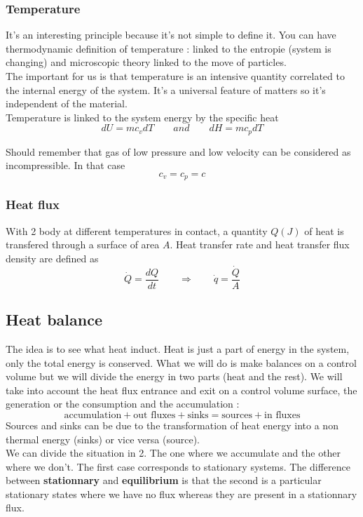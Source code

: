 	\subsubsection{Temperature}
		It's an interesting principle because it’s not simple to define it. You can have thermodynamic definition of temperature : linked to the entropie (system is changing) and microscopic theory linked to the move of particles. \\
		The important for us is that temperature is an intensive quantity correlated to the internal energy of the system. It’s a universal feature of matters so it’s independent of the material. \\
		Temperature is linked to the system energy by the specific heat 
		\begin{equation}
			dU = mc_v dT \qquad and \qquad dH = mc_p dT
		\end{equation}

		Should remember that gas of low pressure and low velocity can be considered as incompressible. In that case 
		\begin{equation}
			c_v = c_p = c
		\end{equation}		 
		
	\subsubsection{Heat flux}
		With 2 body at different temperatures in contact, a quantity $Q(J)$ of heat is transfered through a surface of area $A$. Heat transfer rate and heat transfer flux density are defined as 
		\begin{equation}
			\dot{Q} = \frac{dQ}{dt} \qquad \Rightarrow \qquad \dot{q} = \frac{\dot{Q}}{A}
		\end{equation}
		
\subsection{Heat balance}
		The idea is to see what heat induct. Heat is just a part of energy in the system, only the total energy is conserved. What we will do is make balances on a control volume but we will divide the energy in two parts (heat and the rest). We will take into account the heat flux entrance and exit on a control volume surface, the generation or the consumption and the accumulation :
		\begin{equation}
			\mbox{accumulation} + \mbox{out fluxes} + \mbox{sinks} = \mbox{sources} + \mbox{in fluxes}
		\end{equation}
		Sources and sinks can be due to the transformation of heat energy into a non thermal energy (sinks) or vice versa (source). \\
		We can divide the situation in 2. The one where we accumulate and the other where we don’t. The first case corresponds to stationary systems. The difference between \textbf{stationnary }and \textbf{equilibrium} is that the second is a particular stationary states where we have no flux whereas they are present in a stationnary flux. 

